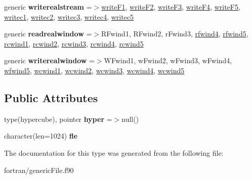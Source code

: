 \begin{DoxyCompactItemize}
\item 
\mbox{\label{structgeneric__file__mod_1_1genericregfile_ab53c717c4ad14264d8a167bf1956bdfc}} 
generic {\bfseries writerealstream} =$>$\hyperlink{interfacegeneric__file__mod_1_1write_f1}{write\+F1}, \hyperlink{interfacegeneric__file__mod_1_1write_f2}{write\+F2}, \hyperlink{interfacegeneric__file__mod_1_1write_f3}{write\+F3}, \hyperlink{interfacegeneric__file__mod_1_1write_f4}{write\+F4}, \hyperlink{interfacegeneric__file__mod_1_1write_f5}{write\+F5}, \hyperlink{interfacegeneric__file__mod_1_1writec1}{writec1}, \hyperlink{interfacegeneric__file__mod_1_1writec2}{writec2}, \hyperlink{interfacegeneric__file__mod_1_1writec3}{writec3}, \hyperlink{interfacegeneric__file__mod_1_1writec4}{writec4}, \hyperlink{interfacegeneric__file__mod_1_1writec5}{writec5}
\item 
\mbox{\label{structgeneric__file__mod_1_1genericregfile_a2001e85c25f7c620358be9a840623383}} 
generic {\bfseries readrealwindow} =$>$R\+Fwind1, R\+Fwind2, r\+Fwind3, \hyperlink{interfacegeneric__file__mod_1_1rfwind4}{rfwind4}, \hyperlink{interfacegeneric__file__mod_1_1rfwind5}{rfwind5}, \hyperlink{interfacegeneric__file__mod_1_1rcwind1}{rcwind1}, \hyperlink{interfacegeneric__file__mod_1_1rcwind2}{rcwind2}, \hyperlink{interfacegeneric__file__mod_1_1rcwind3}{rcwind3}, \hyperlink{interfacegeneric__file__mod_1_1rcwind4}{rcwind4}, \hyperlink{interfacegeneric__file__mod_1_1rcwind5}{rcwind5}
\item 
\mbox{\label{structgeneric__file__mod_1_1genericregfile_a880048efe282661490f8040b7fd7b3c9}} 
generic {\bfseries writerealwindow} =$>$W\+Fwind1, w\+Fwind2, w\+Fwind3, w\+Fwind4, \hyperlink{interfacegeneric__file__mod_1_1wfwind5}{wfwind5}, \hyperlink{interfacegeneric__file__mod_1_1wcwind1}{wcwind1}, \hyperlink{interfacegeneric__file__mod_1_1wcwind2}{wcwind2}, \hyperlink{interfacegeneric__file__mod_1_1wcwind3}{wcwind3}, \hyperlink{interfacegeneric__file__mod_1_1wcwind4}{wcwind4}, \hyperlink{interfacegeneric__file__mod_1_1wcwind5}{wcwind5}
\end{DoxyCompactItemize}
\subsection*{Public Attributes}
\begin{DoxyCompactItemize}
\item 
\mbox{\label{structgeneric__file__mod_1_1genericregfile_ac781f7df98465de2f7064d5f86d15c13}} 
type(hypercube), pointer {\bfseries hyper} =$>$null()
\item 
\mbox{\label{structgeneric__file__mod_1_1genericregfile_ab7eae961775e377620f60f4aafc8b462}} 
character(len=1024) {\bfseries fle}
\end{DoxyCompactItemize}


The documentation for this type was generated from the following file\+:\begin{DoxyCompactItemize}
\item 
fortran/generic\+File.\+f90\end{DoxyCompactItemize}
